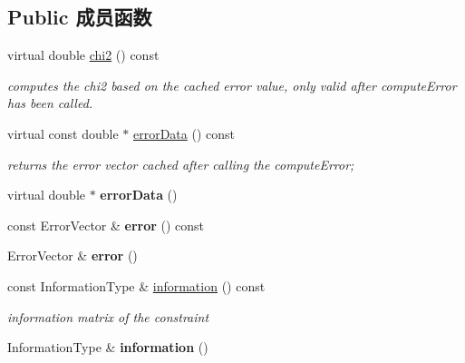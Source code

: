\subsection*{Public 成员函数}
\begin{DoxyCompactItemize}
\item 
\hypertarget{classg2o_1_1BaseEdge_a7ea9406b8cc06b44433569bbd4fcefac}{virtual double \hyperlink{classg2o_1_1BaseEdge_a7ea9406b8cc06b44433569bbd4fcefac}{chi2} () const }\label{classg2o_1_1BaseEdge_a7ea9406b8cc06b44433569bbd4fcefac}

\begin{DoxyCompactList}\small\item\em computes the chi2 based on the cached error value, only valid after compute\-Error has been called. \end{DoxyCompactList}\item 
\hypertarget{classg2o_1_1BaseEdge_a2483ee84ebe78e35e71db7dce703edae}{virtual const double $\ast$ \hyperlink{classg2o_1_1BaseEdge_a2483ee84ebe78e35e71db7dce703edae}{error\-Data} () const }\label{classg2o_1_1BaseEdge_a2483ee84ebe78e35e71db7dce703edae}

\begin{DoxyCompactList}\small\item\em returns the error vector cached after calling the compute\-Error; \end{DoxyCompactList}\item 
\hypertarget{classg2o_1_1BaseEdge_ab80452c1134036928a2af6303412a3c4}{virtual double $\ast$ {\bfseries error\-Data} ()}\label{classg2o_1_1BaseEdge_ab80452c1134036928a2af6303412a3c4}

\item 
\hypertarget{classg2o_1_1BaseEdge_a52fb082b224f30a29248431ea34e9c39}{const Error\-Vector \& {\bfseries error} () const }\label{classg2o_1_1BaseEdge_a52fb082b224f30a29248431ea34e9c39}

\item 
\hypertarget{classg2o_1_1BaseEdge_ad0a9e3b6d5490c8f4af794c77742faae}{Error\-Vector \& {\bfseries error} ()}\label{classg2o_1_1BaseEdge_ad0a9e3b6d5490c8f4af794c77742faae}

\item 
\hypertarget{classg2o_1_1BaseEdge_ab682086df7223ce2b039d652416ddc23}{const Information\-Type \& \hyperlink{classg2o_1_1BaseEdge_ab682086df7223ce2b039d652416ddc23}{information} () const }\label{classg2o_1_1BaseEdge_ab682086df7223ce2b039d652416ddc23}

\begin{DoxyCompactList}\small\item\em information matrix of the constraint \end{DoxyCompactList}\item 
\hypertarget{classg2o_1_1BaseEdge_addff9120320d63504e07bfe17f1d04a7}{Information\-Type \& {\bfseries information} ()}\label{classg2o_1_1BaseEdge_addff9120320d63504e07bfe17f1d04a7}


\end{DoxyCompactItemize}
